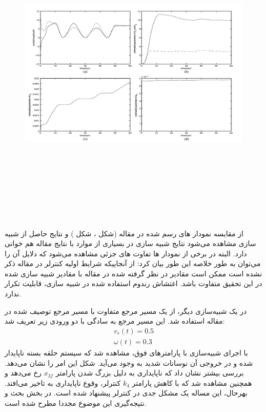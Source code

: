 \begin{figure}[h]
	\centering
	\includegraphics[height=15cm,width=15cm]{img/article_result2}
\end{figure}
از مقایسه نمودار های رسم شده در مقاله (شکل ،
 شکل ) و نتایج حاصل از شبیه سازی مشاهده می‌شود نتایج شبیه سازی در بسیاری از موارد با نتایج مقاله هم خوانی دارد. البته در برخی از نمودار ها تفاوت های جزئی مشاهده می‌شود که دلایل آن را می‌توان به طور خلاصه این طور بیان کرد:
 از آنجاییکه شرایط اولیه کنترلر در مقاله ذکر نشده است ممکن است مقادیر در نظر گرفته شده در مقاله با مقادیر شبیه سازی شده در این تحقیق متفاوت باشد.
 اغتشاش رندوم استفاده شده در شبیه سازی، قابلیت تکرار ندارد. 

در یک شبیه‌سازی دیگر، از یک مسیر مرجع متفاوت با مسیر مرجع توصیف شده در مقاله استفاده شد. این مسیر مرجع به سادگی با دو ورودی زیر تعریف شد:
\begin{align}
	v_r(t) = 0.5 \\
	\omega(t) = 0.3
\end{align}
با اجرای شبیه‌سازی با پارامترهای فوق، مشاهده شد که سیستم حلقه بسته ناپایدار شده و در خروجی آن نوسانات شدید به وجود می‌آید. شکل  این امر را نشان می‌دهد. بررسی بیشتر نشان داد که ناپایداری به دلیل بزرگ شدن پارامتر $x_{3f}$ رخ می‌دهد و همچنین مشاهده شد که با کاهش پارامتر $k_4$ کنترلر، وقوع ناپایداری به تاخیر می‌افتد. بهرحال، این مساله یک مشکل جدی در کنترلر پیشنهاد شده است. در بخش بحث و نتیجه‌گیری این موضوع مجددا مطرح شده است.

